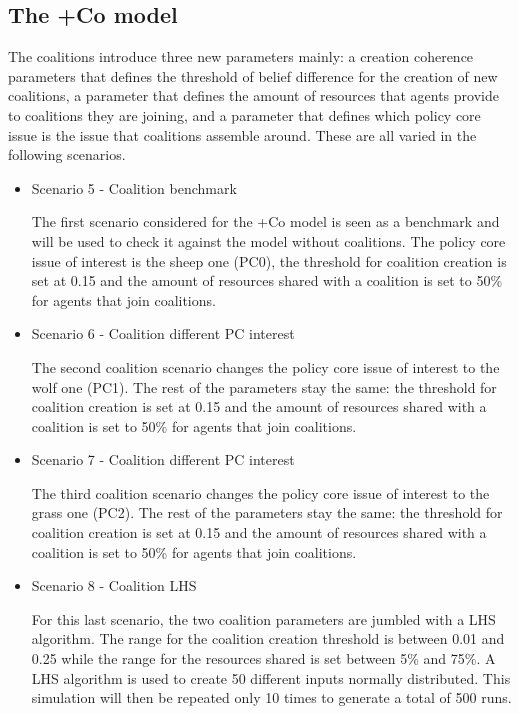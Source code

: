 \documentclass[12pt]{article}
\begin{document}
\subsection{The +Co model}

The coalitions introduce three new parameters mainly: a creation coherence parameters that defines the threshold of belief difference for the creation of new coalitions, a parameter that defines the amount of resources that agents provide to coalitions they are joining, and a parameter that defines which policy core issue is the issue that coalitions assemble around. These are all varied in the following scenarios. 

\begin{itemize}
\item Scenario 5 - Coalition benchmark

The first scenario considered for the +Co model is seen as a benchmark and will be used to check it against the model without coalitions. The policy core issue of interest is the sheep one (PC0), the threshold for coalition creation is set at 0.15 and the amount of resources shared with a coalition is set to 50\% for agents that join coalitions.

\item Scenario 6 - Coalition different PC interest

The second coalition scenario changes the policy core issue of interest to the wolf one (PC1). The rest of the parameters stay the same: the threshold for coalition creation is set at 0.15 and the amount of resources shared with a coalition is set to 50\% for agents that join coalitions.

\item Scenario 7 - Coalition different PC interest

The third coalition scenario changes the policy core issue of interest to the grass one (PC2). The rest of the parameters stay the same: the threshold for coalition creation is set at 0.15 and the amount of resources shared with a coalition is set to 50\% for agents that join coalitions.

\item Scenario 8 - Coalition LHS

For this last scenario, the two coalition parameters are jumbled with a LHS algorithm. The range for the coalition creation threshold is between 0.01 and 0.25 while the range for the resources shared is set between 5\% and 75\%. A LHS algorithm is used to create 50 different inputs normally distributed. This simulation will then be repeated only 10 times to generate a total of 500 runs.

\end{itemize}
\end{document}

